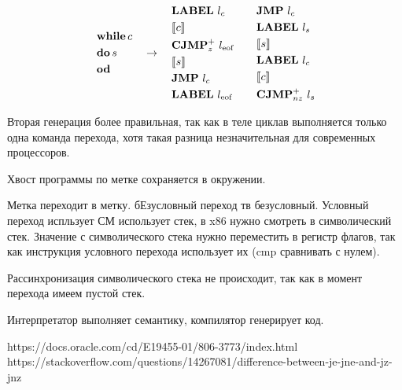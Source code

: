\begin{equation}
    \begin{aligned}[c]
        & \mathop{\mathbf{while}} c \\
        & \mathop{\mathbf{do}} s \\
        & \mathop{\mathbf{od}}
    \end{aligned} \quad \to \quad
    \begin{aligned}[c]
        & \mathord{\mathbf{LABEL}}\ l_c \\
        & \llbracket c \rrbracket \\
        & \mathord{\mathbf{CJMP}}^+_z\ l_{\mathrm{eof}} \\
        & \llbracket s \rrbracket \\
        & \mathord{\mathbf{JMP}}\ l_c \\
        & \mathord{\mathbf{LABEL}}\ l_{\mathrm{eof}} \\
    \end{aligned} \qquad
    \begin{aligned}[c]
        & \mathord{\mathbf{JMP}}\ l_c \\
        & \mathord{\mathbf{LABEL}}\ l_s \\
        & \llbracket s \rrbracket \\
        & \mathord{\mathbf{LABEL}}\ l_c \\
        & \llbracket c \rrbracket \\
        & \mathord{\mathbf{CJMP}}^+_{nz}\ l_s
    \end{aligned}
\end{equation}

Вторая генерация более правильная, так как в теле циклав выполняется только
одна команда перехода, хотя такая разница незначительная для современных
процессоров.

Хвост программы по метке сохраняется в окружении.

Метка переходит в метку. бЕзусловный переход тв безусловный. Условный переход
испльзует СМ использует стек, в x86 нужно смотреть в символический стек.
Значение с символического стека нужно переместить в регистр флагов, так как
инструкция условного перехода использует их (cmp сравнивать с нулем).

Рассинхронизация символического стека не происходит, так как в момент перехода
имеем пустой стек.

Интерпретатор выполняет семантику, компилятор генерирует код.

https://docs.oracle.com/cd/E19455-01/806-3773/index.html
https://stackoverflow.com/questions/14267081/difference-between-je-jne-and-jz-jnz


